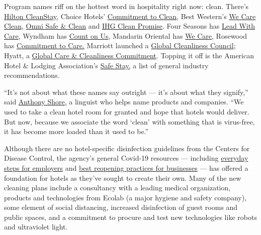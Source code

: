 Program names riff on the hottest word in hospitality right now: clean.
There's
\href{https://newsroom.hilton.com/corporate/news/hilton-defining-new-standard-of-cleanliness}{Hilton
CleanStay}, Choice Hotels'
\href{https://www.prnewswire.com/news-releases/choice-hotels-announces-commitment-to-clean-initiative-301052148.html}{Commitment
to Clean}, Best Western's
\href{https://www.bestwestern.com/en_US/hotels/discover-best-western/we-care-clean.html}{We
Care Clean}, \href{https://www.omnihotels.com/omni-safe-and-clean}{Omni
Safe \& Clean} and
\href{https://www.ihg.com/content/us/en/customer-care/clean-promise}{IHG
Clean Promise}. Four Seasons has
\href{https://press.fourseasons.com/news-releases/2020/lead-with-care-program/}{Lead
With Care}, Wyndham has
\href{https://corporate.wyndhamhotels.com/news-releases/wyndham-hotels-resorts-launches-new-count-on-us-initiative-to-build-confidence-among-guests-and-to-support-franchisees-as-it-unveils-early-plans-to-welcome-back-travelers/}{Count
on Us}, Mandarin Oriental has
\href{https://www.mandarinoriental.com/special-notice}{We Care},
Rosewood has
\href{https://www.rosewoodhotels.com/en/covid-19-update}{Commitment to
Care.} Marriott launched a
\href{https://news.marriott.com/news/2020/04/21/marriott-international-launches-global-cleanliness-council-to-promote-even-higher-standards-of-cleanliness-in-the-age-of-covid-19}{Global
Cleanliness Council}; Hyatt, a
\href{https://www.hyatt.com/info/global-care-and-cleanliness-commitment}{Global
Care \& Cleanliness Commitment}. Topping it off is the American Hotel \&
Lodging Association's \href{https://www.ahla.com/safestay}{Safe Stay,} a
list of general industry recommendations.

``It's not about what these names say outright --- it's about what they
signify,'' said \href{https://www.operativewords.com/}{Anthony Shore,} a
linguist who helps name products and companies. ``We used to take a
clean hotel room for granted and hope that hotels would deliver. But
now, because we associate the word `clean' with something that is
virus-free, it has become more loaded than it used to be.''

Although there are no hotel-specific disinfection guidelines from the
Centers for Disease Control, the agency's general Covid-19 resources ---
including
\href{https://www.cdc.gov/coronavirus/2019-ncov/community/disinfecting-building-facility.html}{everyday
steps for employers} and
\href{https://www.cdc.gov/coronavirus/2019-ncov/community/reopen-guidance.html}{best
reopening practices for businesses} --- has offered a foundation for
hotels as they've sought to create their own. Many of the new cleaning
plans include a consultancy with a leading medical organization,
products and technologies from Ecolab (a major hygiene and safety
company), some element of social distancing, increased disinfection of
guest rooms and public spaces, and a commitment to procure and test new
technologies like robots and ultraviolet light.

